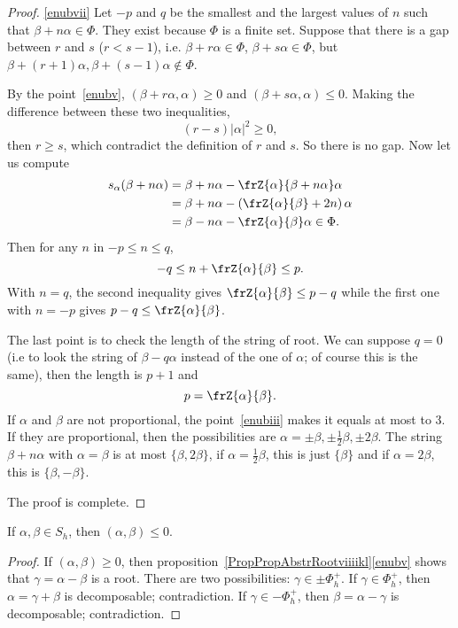 \begin{proof}
\ref{enubvii} Let $-p$ and $q$ be the smallest and the largest values of $n$ such that $\beta+n\alpha \in\Phi$. They exist because $\Phi$ is a finite set. Suppose that there is a gap between $r$ and $s$ ($r<s-1$), i.e. $\beta+r\alpha\in\Phi$, $\beta+s\alpha\in\Phi$, but $\beta+(r+1)\alpha,\beta+(s-1)\alpha\notin\Phi$.

By the point~\ref{enubv}, $(\beta+r\alpha,\alpha)\geq 0$ and $(\beta+s\alpha,\alpha)\leq 0$. Making the difference between these two inequalities,
\[
   (r-s)|\alpha|^2\geq 0,
\]
then $r\geq s$, which contradict the definition of $r$ and $s$. So there is no gap. Now let us compute
\begin{equation}
\begin{split}
   s_{\alpha}(\beta+n\alpha)&=\beta+n\alpha-\frZ{\alpha}{\beta+n\alpha}\alpha\\
                          &=\beta+n\alpha-\left(    \frZ{\alpha}{\beta}+2n    \right)\alpha\\
              &=\beta-n\alpha-\frZ{\alpha}{\beta}\alpha\in\Phi.
\end{split}
\end{equation}
Then for any $n$ in $-p\leq n\leq q$,
\[
   -q\leq n+\frZ{\alpha}{\beta}\leq p.
\]
With $n=q$, the second inequality gives $\frZ{\alpha}{\beta}\leq p-q$ while the first one with $n=-p$ gives  $p-q\leq\frZ{\alpha}{\beta}$.

The last point is to check the length of the string of root. We can suppose $q=0$ (i.e to look the string of $\beta-q\alpha$ instead of the one of $\alpha$; of course this is the same), then the length is $p+1$ and
\[
   p=\frZ{\alpha}{\beta}.
\]
If $\alpha$ and $\beta$ are not proportional, the point~\ref{enubiii} makes it equals at most to $3$. If they are proportional, then the possibilities are $\alpha=\pm\beta,\pm\frac{1}{2}\beta,\pm 2\beta$. The string $\beta+n\alpha$ with $\alpha=\beta$ is at most $\{\beta,2\beta\}$, if $\alpha=\frac{1}{2}\beta$, this is just $\{\beta\}$ and if $\alpha=2\beta$, this is $\{\beta,-\beta\}$.

The proof is complete.
\end{proof}

\begin{lemma}       \label{LemShabShablesz}
    If \( \alpha,\beta\in S_h\), then \( (\alpha,\beta)\leq 0\).
\end{lemma}

\begin{proof}
    If \( (\alpha,\beta)\geq 0\), then proposition~\ref{PropPropAbstrRootviiiikl}\ref{enubv} shows that \( \gamma=\alpha-\beta\) is a root. There are two possibilities: \( \gamma\in\pm\Phi^+_h\). If \( \gamma\in\Phi^+_h\), then \( \alpha=\gamma+\beta\) is decomposable; contradiction. If \( \gamma\in -\Phi^+_h\), then \( \beta=\alpha-\gamma\) is decomposable; contradiction.
\end{proof}

